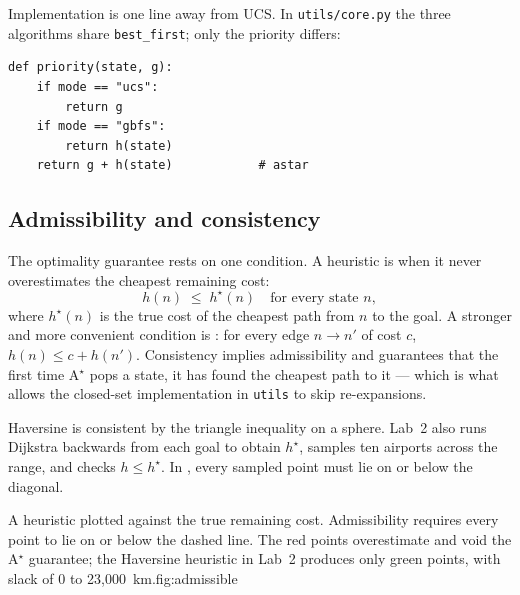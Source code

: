 Implementation is one line away from UCS. In \texttt{utils/core.py} the three algorithms share \texttt{best\_first}; only the priority differs:

\begin{lstlisting}[style=aipython]
def priority(state, g):
    if mode == "ucs":
        return g
    if mode == "gbfs":
        return h(state)
    return g + h(state)            # astar
\end{lstlisting}

\subsection{Admissibility and consistency}

The optimality guarantee rests on one condition. A heuristic is  when it never overestimates the cheapest remaining cost:
\[
h(n)\;\le\;h^\star(n)\quad\text{for every state } n,
\]
where $h^\star(n)$ is the true cost of the cheapest path from $n$ to the goal. A stronger and more convenient condition is : for every edge $n\to n'$ of cost $c$, $h(n)\le c+h(n')$. Consistency implies admissibility and guarantees that the first time A$^\star$ pops a state, it has found the cheapest path to it --- which is what allows the closed-set implementation in \texttt{utils} to skip re-expansions.

Haversine is consistent by the triangle inequality on a sphere. Lab~2 also runs Dijkstra backwards from each goal to obtain $h^\star$, samples ten airports across the range, and checks $h\le h^\star$. In , every sampled point must lie on or below the diagonal.

\begin{aifig}{A heuristic plotted against the true remaining cost. Admissibility requires every point to lie on or below the dashed line. The red points overestimate and void the A$^\star$ guarantee; the Haversine heuristic in Lab~2 produces only green points, with slack of 0 to 23,000~km.}{fig:admissible}
\end{aifig}

